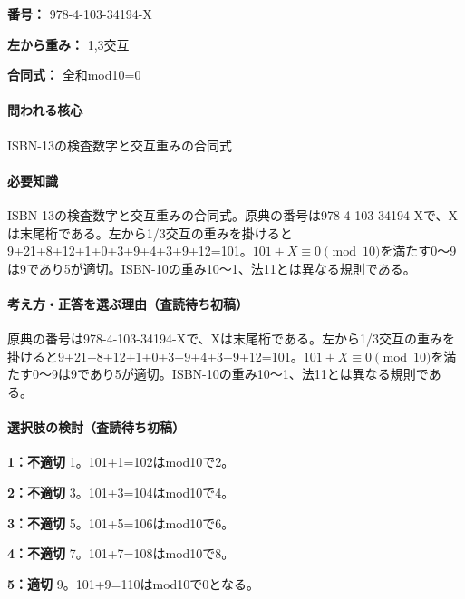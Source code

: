 \noindent\textbf{番号：} 978-4-103-34194-X\par

\noindent\textbf{左から重み：} 1,3交互\par

\noindent\textbf{合同式：} 全和mod10=\allowbreak{}0\par

\paragraph{問われる核心} ISBN-13の検査数字と交互重みの合同式

\paragraph{必要知識} ISBN-13の検査数字と交互重みの合同式。原典の番号は978-4-103-34194-Xで、Xは末尾桁である。左から1/3交互の重みを掛けると9+21+8+12+1+0+3+9+4+3+9+12=\allowbreak{}101。\(101+X\equiv0\pmod{10}\)を満たす0〜9は9であり5が適切。ISBN-10の重み10〜1、法11とは異なる規則である。

\paragraph{考え方・正答を選ぶ理由（査読待ち初稿）} 原典の番号は978-4-103-34194-Xで、Xは末尾桁である。左から1/3交互の重みを掛けると9+21+8+12+1+0+3+9+4+3+9+12=\allowbreak{}101。\(101+X\equiv0\pmod{10}\)を満たす0〜9は9であり5が適切。ISBN-10の重み10〜1、法11とは異なる規則である。

\paragraph{選択肢の検討（査読待ち初稿）}\mbox{}\par

\noindent\textbf{1：不適切} 1。101+1=\allowbreak{}102はmod10で2。\par

\noindent\textbf{2：不適切} 3。101+3=\allowbreak{}104はmod10で4。\par

\noindent\textbf{3：不適切} 5。101+5=\allowbreak{}106はmod10で6。\par

\noindent\textbf{4：不適切} 7。101+7=\allowbreak{}108はmod10で8。\par

\noindent\textbf{5：適切} 9。101+9=\allowbreak{}110はmod10で0となる。\par


